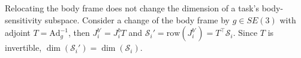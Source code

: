\documentclass[../main.tex]{subfiles}
\begin{document}
\begin{remark}
Relocating the body frame does not change the dimension of a task's body-sensitivity subspace. Consider a change of the body frame by $g\in SE(3)$ with adjoint $T=\mathrm{Ad}_{g}^{-1}$, then
$J_i^{b'}=J_i^{b}T$ and $\mathcal S_i'=\mathrm{row}(J_i^{b'})=T^\top\mathcal S_i$.
Since $T$ is invertible, $\dim(\mathcal S_i')=\dim(\mathcal S_i)$.
\end{remark}




\end{document}
